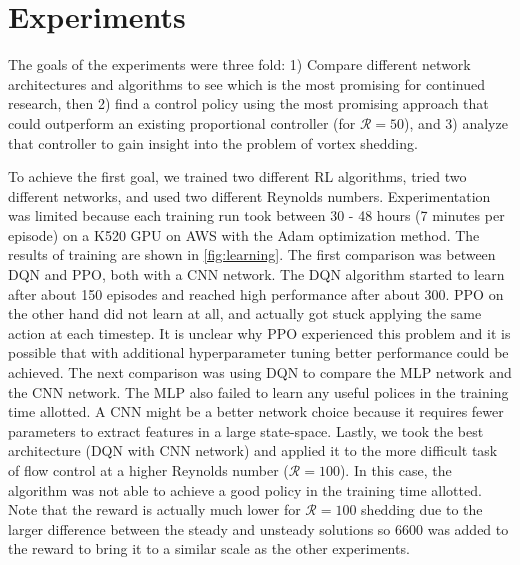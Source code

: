 \documentclass{article}
\begin{document}
\section{Experiments}
\label{sec:experiments}

The goals of the experiments were three fold: 1) Compare different network architectures and algorithms to see which is the most promising for continued research, then 2) find a control policy using the most promising approach that could outperform an existing proportional controller (for $\mathcal{R} = 50$), and 3) analyze that controller to gain insight into the problem of vortex shedding. 

To achieve the first goal, we trained two different RL algorithms, tried two different networks, and used two different Reynolds numbers. Experimentation was limited because each training run took between \num{30} - \num{48} hours (7 minutes per episode) on a K520 GPU on AWS with the Adam optimization method. The results of training are shown in \cref{fig:learning}. The first comparison was between DQN and PPO, both with a CNN network. The DQN algorithm started to learn after about \num{150} episodes and reached high performance after about \num{300}. PPO on the other hand did not learn at all, and actually got stuck applying the same action at each timestep. It is unclear why PPO experienced this problem and it is possible that with additional hyperparameter tuning better performance could be achieved. The next comparison was using DQN to compare the MLP network and the CNN network. The MLP also failed to learn any useful polices in the training time allotted. A CNN might be a better network choice because it requires fewer parameters to extract features in a large state-space. Lastly, we took the best architecture (DQN with CNN network) and applied it to the more difficult task of flow control at a higher Reynolds number ($\mathcal{R} = 100$). In this case, the algorithm was not able to achieve a good policy in the training time allotted. Note that the reward is actually much lower for $\mathcal{R} = 100$ shedding due to the larger difference between the steady and unsteady solutions so \num{6600} was added to the reward to bring it to a similar scale as the other experiments.
\end{document}
